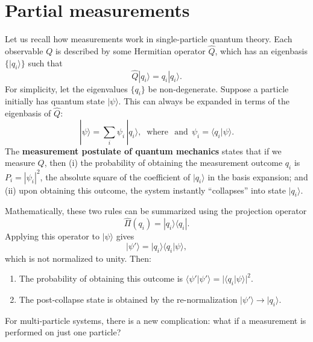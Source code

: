 \documentclass[pra,12pt]{revtex4}
\begin{document}
\section{Partial measurements}
\label{sec:partialmeasurements}

Let us recall how measurements work in single-particle quantum theory.
Each observable $Q$ is described by some Hermitian operator $\hat{Q}$,
which has an eigenbasis $\{|q_i\rangle\}$ such that
\begin{equation}
  \hat{Q}|q_i\rangle = q_i |q_i\rangle.
\end{equation}
For simplicity, let the eigenvalues $\{q_i\}$ be non-degenerate.
Suppose a particle initially has quantum state $|\psi\rangle$.  This
can always be expanded in terms of the eigenbasis of $\hat{Q}$:
\begin{equation}
  |\psi\rangle = \sum_i \psi_i\, |q_i\rangle, \;\;\mathrm{where}\;\;\,\textrm{and}\;\, \psi_i = \langle q_i|\psi\rangle.
\end{equation}
The \textbf{measurement postulate of quantum mechanics} states that if
we measure $Q$, then (i) the probability of obtaining the measurement
outcome $q_i$ is $P_i = |\psi_i|^2$, the absolute square of the
coefficient of $|q_i\rangle$ in the basis expansion; and (ii) upon
obtaining this outcome, the system instantly ``collapses'' into state
$|q_i\rangle$.

Mathematically, these two rules can be summarized using the projection
operator
\begin{equation}
  \hat{\Pi}(q_i) = |q_i\rangle\langle q_i|.
\end{equation}
Applying this operator to $|\psi\rangle$ gives
\begin{equation}
  |\psi'\rangle = |q_i\rangle \langle q_i|\psi\rangle,
\end{equation}
which is not normalized to unity.  Then:
\begin{enumerate}
\item The probability of obtaining this outcome is
  $\langle\psi'|\psi'\rangle = |\langle q_i|\psi\rangle|^2$.

\item The post-collapse state is obtained by the re-normalization
  $|\psi'\rangle \rightarrow |q_i\rangle$.
\end{enumerate}

For multi-particle systems, there is a new complication: what if a
measurement is performed on just one particle?
\end{document}
